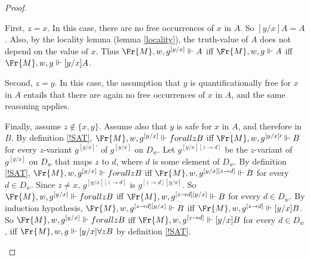 \documentclass[11pt]{woarticle}
\theoremstyle{break}
\theoremstyle{nonumberplain}
\newcommand{\SAT}{\Vdash}
\newcommand{\1}{\;\,|\;\,}
\begin{document}
\begin{proof}
\begin{enumerate}
          First, $z = x$. In this case, there are no free occurrences of $x$ in
          $A$. So $[y/x]A = A$. Also, by the locality lemma (lemma
          \ref{locality}), the truth-value of $A$ does not depend on the value
          of $x$. Thus $\Fr{M},w,g^{[y/x]} \SAT A$ iff $\Fr{M},w,g \SAT A$ iff
          $\Fr{M},w,g \SAT [y/x]A$.

          Second, $z = y$. In this case, the assumption that $y$ is
          quantificationally free for $x$ in $A$ entails that there are again no
          free occurrences of $x$ in $A$, and the same reasoning applies.

          Finally, assume $z \not\in \{x,y\}$. Assume also that $y$ is safe for
          $x$ in $A$, and therefore in $B$. By definition \ref{!SAT},
          $\Fr{M},w,g^{[y/x]} \SAT forall z B$ iff $\Fr{M},w,g^{[y/x]\prime} \SAT B$
          for every $z$-variant $g^{[y/x]\prime}$ of $g^{[y/x]}$ on $D_{w}$. Let
          $g^{[y/x][z\to d]}$ be the $z$-variant of $g^{[y/x]}$ on $D_{w}$ that maps
          $z$ to $d$, where $d$ is some element of $D_{w}$. By definition
          \ref{!SAT}, $\Fr{M},w,g^{[y/x]} \SAT forall z B$ iff
          $\Fr{M},w,g^{[y/x][z\to d]} \SAT B$ for every $d\in D_{w}$. Since
          $z \not= x$, $g^{[y/x][z\to d]}$ is $g^{[z\to d][y/x]}$.
          So $\Fr{M},w,g^{[y/x]} \SAT forall z B$ iff
          $\Fr{M},w,g^{[z\to d][y/x]} \SAT B$ for every $d\in D_{w}$. By induction hypothesis,
          $\Fr{M},w,g^{[z\to d][y/x]} \SAT B$ iff
          $\Fr{M},w,g^{[z\to d]} \SAT [y/x]B$.
          So $\Fr{M},w,g^{[y/x]} \SAT forall z B$ iff
          $\Fr{M},w,g^{[z\to d]} \SAT [y/x]B$ for every $d\in D_{w}$, iff
          $\Fr{M},w,g \SAT [y/x]\forall z B$ by definition \ref{!SAT}.




\end{enumerate}
\end{proof}
\end{document}
